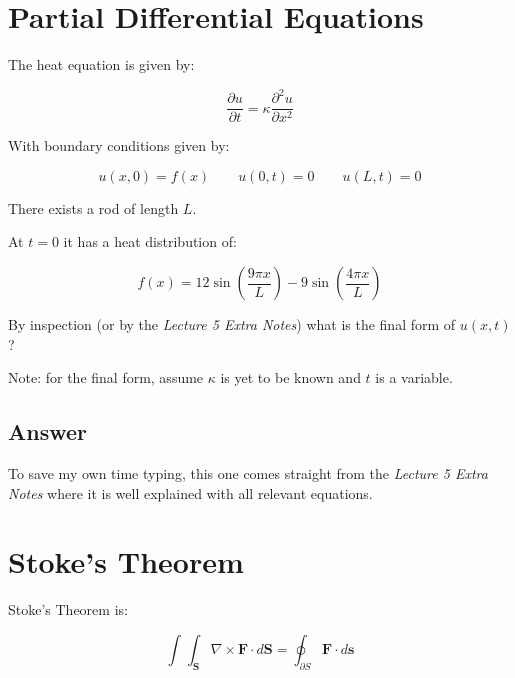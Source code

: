 \documentclass{article}
\begin{document}
\clearpage
\section{Partial Differential Equations}

The heat equation is given by:

\begin{equation}
  \frac{\partial u }{\partial t} = \kappa \frac{\partial^{2}u}{\partial x^{2}}
\end{equation}

With boundary conditions given by:

\begin{equation}
  u(x,0) = f(x) \qquad u(0,t) = 0 \qquad u(L,t) = 0
\end{equation}

There exists a rod of length $L$.

At $t=0$ it has a heat distribution of:

\begin{equation}
  f(x) = 12 \sin\left( \frac{9 \pi x}{L} \right) - 
  9 \sin\left( \frac{4 \pi x}{L} \right)
\end{equation}

By inspection (or by the \textit{Lecture 5 Extra Notes}) what is the 
final form of $u(x,t)$?

\vspace{1cm}
Note: for the final form, assume $\kappa$ is yet to be known and $t$ is a variable.

\subsection{Answer}

To save my own time typing, this one comes straight from the \textit{Lecture 5
Extra Notes} where it is well explained with all relevant equations. 



\clearpage
\section{Stoke's Theorem}

Stoke's Theorem is: 

\begin{equation}
  \int^{}_{} \int^{}_{\mathbf{S}} \nabla \times \mathbf{F} \cdot d\mathbf{S} = 
  \oint_{\partial S} \mathbf{F} \cdot d\mathbf{s}
\end{equation}
\end{document}
